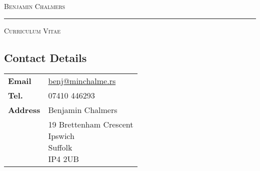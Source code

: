\documentclass[9pt,a4paper]{article}
\begin{document}
\begin{center}

  \textsc{\Huge{Benjamin Chalmers}}
  \vspace{0.3cm}

  \noindent\rule{0.8\textwidth}{0.4pt}
  \vspace{0.3cm}

  \textsc{\large{Curriculum Vitae}}
  \vspace{0.2cm}

\end{center}
\begin{multicols*}{2}
  \section*{Contact Details} 
\begin{center}
  \begin{tabular}{p{1.2cm}p{6cm}}
    \textbf{Email}&\href{mailto:benj@minchalme.rs}{benj@minchalme.rs}\\
    \textbf{Tel.}&07410 446293\\
    \textbf{Address}&Benjamin Chalmers\\
    &\parbox{5cm}{19 Brettenham Crescent\\Ipswich\\Suffolk\\IP4 2UB}\\
  \end{tabular}
\end{center}


\end{multicols*}
\end{document}

